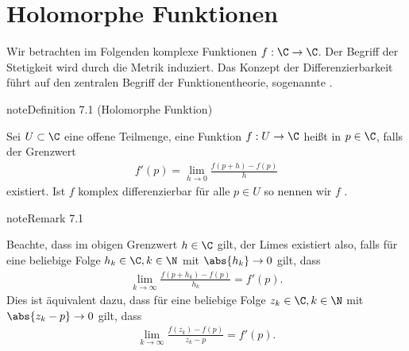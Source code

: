 \documentclass[letterpaper,10pt,german]{jupyterBook}
\begin{document}
\section{Holomorphe Funktionen}
\label{\detokenize{complexanalysis/cauchyriemann:holomorphe-funktionen}}\label{\detokenize{complexanalysis/cauchyriemann::doc}}
\sphinxAtStartPar
Wir betrachten im Folgenden komplexe Funktionen \(f:\C\to\C\). Der Begriff der Stetigkeit wird durch die Metrik induziert. Das Konzept der Differenzierbarkeit führt auf den zentralen Begriff der Funktionentheorie, sogenannte .
\label{complexanalysis/cauchyriemann:def:holomorph}
\begin{sphinxadmonition}{note}{Definition 7.1 (Holomorphe Funktion)}



\sphinxAtStartPar
Sei \(U \subset \C\) eine offene Teilmenge, eine Funktion \(f:U\to\C\) heißt  in \(p\in\C\), falls der Grenzwert
\begin{equation*}
\begin{split}f'(p) = \lim_{h\rightarrow 0} \frac{f(p+h) - f(p)}{h}\end{split}
\end{equation*}
\sphinxAtStartPar
existiert. Ist \(f\) komplex differenzierbar für alle \(p\in U\) so nennen wir \(f\) .
\end{sphinxadmonition}
\label{complexanalysis/cauchyriemann:remark-1}
\begin{sphinxadmonition}{note}{Remark 7.1}



\sphinxAtStartPar
Beachte, dass im obigen Grenzwert \(h\in\C\) gilt, der Limes existiert also, falls für eine beliebige Folge \(h_k\in\C,k\in\N\) mit \(\abs{h_k}\to 0\) gilt, dass
\begin{equation*}
\begin{split}\lim_{k\to\infty} \frac{f(p+h_k) - f(p)}{h_k} = f'(p).\end{split}
\end{equation*}
\sphinxAtStartPar
Dies ist äquivalent dazu, dass für eine beliebige Folge \(z_k\in\C,k\in\N\) mit \(\abs{z_k-p}\to 0\) gilt, dass
\begin{equation*}
\begin{split}\lim_{k\to\infty} \frac{f(z_k) - f(p)}{z_k - p} = f'(p).\end{split}
\end{equation*}\end{sphinxadmonition}
\end{document}
